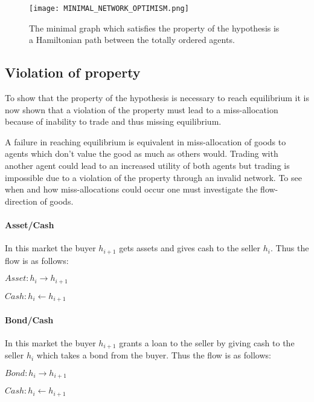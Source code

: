 \documentclass[Bachelorarbeit.tex]{subfiles}
\begin{document}
\begin{figure}[H]
	\centering
  \texttt{[image: MINIMAL\_NETWORK\_OPTIMISM.png]}
  	\caption{The minimal graph which satisfies the property of the hypothesis is a Hamiltonian path between the totally ordered agents.}
	\label{fig:MINIMAL_NETWORK_OPTIMISM}
\end{figure}

\subsection{Violation of property}
To show that the property of the hypothesis is necessary to reach equilibrium it is now shown that a violation of the property must lead to a miss-allocation because of inability to trade and thus missing equilibrium.

\medskip

A failure in reaching equilibrium is equivalent in miss-allocation of goods to agents which don't value the good as much as others would. Trading with another agent could lead to an increased utility of both agents but trading is impossible due to a violation of the property through an invalid network. To see when and how miss-allocations could occur one must investigate the flow-direction of goods.

\paragraph{Asset/Cash} In this market the buyer $h_{i+1}$ gets assets and gives cash to the seller $h_i$. Thus the flow is as follows:
\begin{center}
$Asset: h_i \to h_{i+1}$
\end{center}
\begin{center}
$Cash: h_i \gets h_{i+1}$
\end{center}

\paragraph{Bond/Cash} In this market the buyer $h_{i+1}$ grants a loan to the seller by giving cash to the seller $h_i$ which takes a bond from the buyer. Thus the flow is as follows:
\begin{center}
$Bond: h_i \to h_{i+1}$
\end{center}
\begin{center}
$Cash: h_i \gets h_{i+1}$
\end{center}
\end{document}
